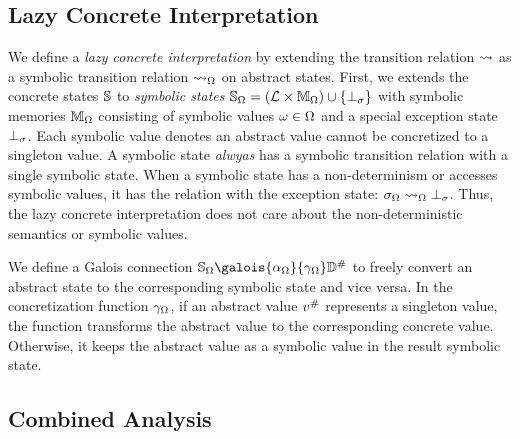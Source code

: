 \subsection{Lazy Concrete Interpretation}

We define a \textit{lazy concrete interpretation} by extending the transition
relation $\leadsto$ as a symbolic transition relation $\leadsto_\Omega$ on abstract
states. First, we extends the concrete states $\mathbb{S}$ to \textit{symbolic
states} $\mathbb{S}_\Omega = (\mathcal{L} \times \mathbb{M}_\Omega) \cup \{ \bot_\sigma \}$ with
symbolic memories $\mathbb{M}_\Omega$ consisting of symbolic values $\omega \in
\Omega$ and a special exception state $\bot_\sigma$. Each symbolic value denotes an
abstract value cannot be concretized to a singleton value.  A symbolic state
\textit{alwyas} has a symbolic transition relation with a single symbolic state.
When a symbolic state has a non-determinism or accesses symbolic values, it has
the relation with the exception state: $\sigma_\Omega \leadsto_\Omega \bot_\sigma$.  Thus, the lazy
concrete interpretation does not care about the non-deterministic semantics or
symbolic values.

We define a Galois connection $\symbstset
\galois{\alpha_\symbset}{\gamma_\symbset} \absdom$ to freely convert an abstract
state to the corresponding symbolic state and vice versa.  In the concretization
function $\gamma_\Omega$, if an abstract value ${v}^{\#}$ represents a
singleton value, the function transforms the abstract value to the
corresponding concrete value.  Otherwise, it keeps the abstract value as a
symbolic value in the result symbolic state.


\subsection{Combined Analysis}

